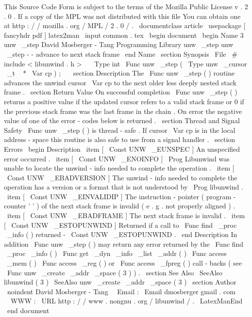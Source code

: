 %
This
Source
Code
Form
is
subject
to
the
terms
of
the
Mozilla
Public
%
License
v
.
2
.
0
.
If
a
copy
of
the
MPL
was
not
distributed
with
this
%
file
You
can
obtain
one
at
http
:
/
/
mozilla
.
org
/
MPL
/
2
.
0
/
.
\
documentclass
{
article
}
\
usepackage
[
fancyhdr
pdf
]
{
latex2man
}
\
input
{
common
.
tex
}
\
begin
{
document
}
\
begin
{
Name
}
{
3
}
{
unw
\
_step
}
{
David
Mosberger
-
Tang
}
{
Programming
Library
}
{
unw
\
_step
}
unw
\
_step
-
-
advance
to
next
stack
frame
\
end
{
Name
}
\
section
{
Synopsis
}
\
File
{
\
#
include
<
libunwind
.
h
>
}
\
\
\
Type
{
int
}
\
Func
{
unw
\
_step
}
(
\
Type
{
unw
\
_cursor
\
_t
~
*
}
\
Var
{
cp
}
)
;
\
\
\
section
{
Description
}
The
\
Func
{
unw
\
_step
}
(
)
routine
advances
the
unwind
cursor
\
Var
{
cp
}
to
the
next
older
less
deeply
nested
stack
frame
.
\
section
{
Return
Value
}
On
successful
completion
\
Func
{
unw
\
_step
}
(
)
returns
a
positive
value
if
the
updated
cursor
refers
to
a
valid
stack
frame
or
0
if
the
previous
stack
frame
was
the
last
frame
in
the
chain
.
On
error
the
negative
value
of
one
of
the
error
-
codes
below
is
returned
.
\
section
{
Thread
and
Signal
Safety
}
\
Func
{
unw
\
_step
}
(
)
is
thread
-
safe
.
If
cursor
\
Var
{
cp
}
is
in
the
local
address
-
space
this
routine
is
also
safe
to
use
from
a
signal
handler
.
\
section
{
Errors
}
\
begin
{
Description
}
\
item
[
\
Const
{
UNW
\
_EUNSPEC
}
]
An
unspecified
error
occurred
.
\
item
[
\
Const
{
UNW
\
_ENOINFO
}
]
\
Prog
{
Libunwind
}
was
unable
to
locate
the
unwind
-
info
needed
to
complete
the
operation
.
\
item
[
\
Const
{
UNW
\
_EBADVERSION
}
]
The
unwind
-
info
needed
to
complete
the
operation
has
a
version
or
a
format
that
is
not
understood
by
\
Prog
{
libunwind
}
.
\
item
[
\
Const
{
UNW
\
_EINVALIDIP
}
]
The
instruction
-
pointer
(
program
-
counter
'
'
)
of
the
next
stack
frame
is
invalid
(
e
.
g
.
not
properly
aligned
)
.
\
item
[
\
Const
{
UNW
\
_EBADFRAME
}
]
The
next
stack
frame
is
invalid
.
\
item
[
\
Const
{
UNW
\
_ESTOPUNWIND
}
]
Returned
if
a
call
to
\
Func
{
find
\
_proc
\
_info
}
(
)
returned
-
\
Const
{
UNW
\
_ESTOPUNWIND
}
.
\
end
{
Description
}
In
addition
\
Func
{
unw
\
_step
}
(
)
may
return
any
error
returned
by
the
\
Func
{
find
\
_proc
\
_info
}
(
)
\
Func
{
get
\
_dyn
\
_info
\
_list
\
_addr
}
(
)
\
Func
{
access
\
_mem
}
(
)
\
Func
{
access
\
_reg
}
(
)
or
\
Func
{
access
\
_fpreg
}
(
)
call
-
backs
(
see
\
Func
{
unw
\
_create
\
_addr
\
_space
}
(
3
)
)
.
\
section
{
See
Also
}
\
SeeAlso
{
libunwind
(
3
)
}
\
SeeAlso
{
unw
\
_create
\
_addr
\
_space
(
3
)
}
\
section
{
Author
}
\
noindent
David
Mosberger
-
Tang
\
\
Email
:
\
Email
{
dmosberger
gmail
.
com
}
\
\
WWW
:
\
URL
{
http
:
/
/
www
.
nongnu
.
org
/
libunwind
/
}
.
\
LatexManEnd
\
end
{
document
}
